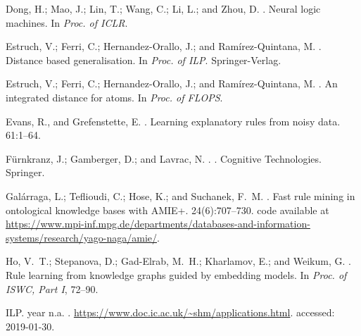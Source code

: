 \documentclass[letterpaper]{article} \usepackage{aaai20}  \usepackage{times}  \usepackage{helvet} \usepackage{courier}  \usepackage[hyphens]{url}  \usepackage{graphicx} \urlstyle{rm} \def\UrlFont{\rm}  \usepackage{graphicx}  \frenchspacing  \setlength{\pdfpagewidth}{8.5in}  \setlength{\pdfpageheight}{11in}  \usepackage{amsthm}
\theoremstyle{definition}
\begin{document}
\begin{thebibliography}{}
Dong, H.; Mao, J.; Lin, T.; Wang, C.; Li, L.; and Zhou, D.
.
\newblock Neural logic machines.
\newblock In {\em Proc. of ICLR}.

Estruch, V.; Ferri, C.; Hernandez-Orallo, J.; and Ramírez-Quintana, M.
.
\newblock Distance based generalisation.
\newblock In {\em Proc. of ILP}.
\newblock Springer-Verlag.

Estruch, V.; Ferri, C.; Hernandez-Orallo, J.; and Ramírez-Quintana, M.
.
\newblock An integrated distance for atoms.
\newblock In {\em Proc. of FLOPS}.

Evans, R., and Grefenstette, E.
.
\newblock Learning explanatory rules from noisy data.
 61:1--64.

F{\"{u}}rnkranz, J.; Gamberger, D.; and Lavrac, N.
.
.
\newblock Cognitive Technologies. Springer.

Gal{\'{a}}rraga, L.; Teflioudi, C.; Hose, K.; and Suchanek, F.~M.
.
\newblock Fast rule mining in ontological knowledge bases with {AMIE+}.
 24(6):707--730.
\newblock code available at
  \url{https://www.mpi-inf.mpg.de/departments/databases-and-information-systems/research/yago-naga/amie/}.

Ho, V.~T.; Stepanova, D.; Gad{-}Elrab, M.~H.; Kharlamov, E.; and Weikum, G.
.
\newblock Rule learning from knowledge graphs guided by embedding models.
\newblock In {\em Proc. of ISWC, Part {I}},  72--90.

ILP.
\newblock year n.a.
.
\newblock \url{https://www.doc.ic.ac.uk/~shm/applications.html}.
\newblock accessed: 2019-01-30.


\end{thebibliography}
\end{document}
